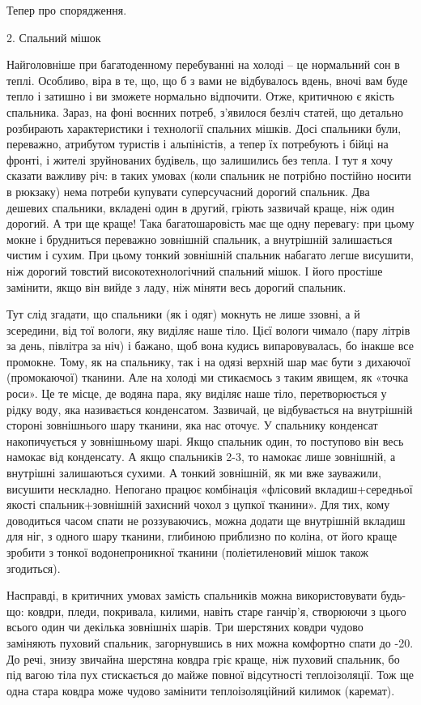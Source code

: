 Тепер про спорядження.

2. Спальний мішок

Найголовніше при багатоденному перебуванні на холоді – це нормальний сон в
теплі. Особливо, віра в те, що, що б з вами не відбувалось вдень, вночі вам
буде тепло і затишно і ви зможете нормально відпочити. Отже, критичною є якість
спальника. Зараз, на фоні воєнних потреб, з’явилося безліч статей, що детально
розбирають характеристики і технології спальних мішків. Досі спальники були,
переважно, атрибутом туристів і альпіністів, а тепер їх потребують і бійці на
фронті, і жителі зруйнованих будівель, що залишились без тепла. І тут я хочу
сказати важливу річ: в таких умовах (коли спальник не потрібно постійно носити
в рюкзаку) нема потреби купувати суперсучасний дорогий спальник. Два дешевих
спальники, вкладені один в другий, гріють зазвичай краще, ніж один дорогий. А
три ще краще! Така багатошаровість має ще одну перевагу: при цьому мокне і
брудниться переважно зовнішній спальник, а внутрішній залишається чистим і
сухим. При цьому тонкий зовнішній спальник набагато легше висушити, ніж дорогий
товстий високотехнологічний спальний мішок. І його простіше замінити, якщо він
вийде з ладу, ніж міняти весь дорогий спальник. 

Тут слід згадати, що спальники (як і одяг) мокнуть не лише ззовні, а й
зсередини, від тої вологи, яку виділяє наше тіло. Цієї вологи чимало (пару
літрів за день, півлітра за ніч) і бажано, щоб вона кудись випаровувалась, бо
інакше все промокне. Тому, як на спальнику, так і на одязі верхній шар має бути
з дихаючої (промокаючої) тканини. Але на холоді ми стикаємось з таким явищем,
як «точка роси». Це те місце, де водяна пара, яку виділяє наше тіло,
перетворюється у рідку воду, яка називається конденсатом. Зазвичай, це
відбувається на внутрішній стороні зовнішнього шару тканини, яка нас оточує. У
спальнику конденсат накопичується у зовнішньому шарі. Якщо спальник один, то
поступово він весь намокає від конденсату. А якщо спальників 2-3, то намокає
лише зовнішній, а внутрішні залишаються сухими. А тонкий зовнішній, як ми вже
зауважили, висушити нескладно. Непогано працює комбінація «флісовий
вкладиш+середньої якості спальник+зовнішній захисний чохол з цупкої тканини».
Для тих, кому доводиться часом спати не роззуваючись, можна додати ще
внутрішній вкладиш для ніг, з одного шару тканини, глибиною приблизно по
коліна, от його краще зробити з тонкої водонепроникної тканини (поліетиленовий
мішок також згодиться).

Насправді, в критичних умовах замість спальників можна використовувати будь-що:
ковдри, пледи, покривала, килими, навіть старе ганчір’я, створюючи з цього
всього один чи декілька зовнішніх шарів. Три шерстяних ковдри чудово заміняють
пуховий спальник, загорнувшись в них можна комфортно спати до -20. До речі,
знизу звичайна шерстяна ковдра гріє краще, ніж пуховий спальник, бо під вагою
тіла пух стискається до майже повної відсутності теплоізоляції. Тож ще одна
стара ковдра може чудово замінити теплоізоляційний килимок (каремат).


